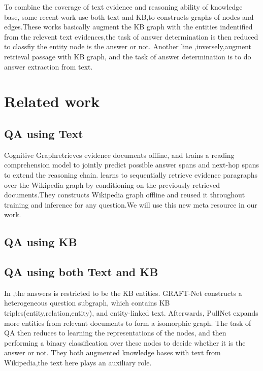 \documentclass[sigconf]{acmart}
\begin{document}
	To combine the coverage of text evidence and reasoning ability of knowledge base, some recent work  use both text and KB,to constructs graphs of nodes and edges\cite{sun2018open,sun2019pullnet,xiong2019improving}.These works basically augment the KB graph with the entities indentified from the relevent text evidences,the task of answer determination is then reduced to classfiy the entity node is the answer or not.
	Another line\cite{min2019knowledge,ding2019cognitive} ,inversely,augment retrieval passage with KB graph, and the task of answer determination is to do answer extraction from text.
	
	\section{Related work}
	\subsection{QA using Text}
	Cognitive Graph\cite{ding2019cognitive}retrieves evidence documents offline, and trains a reading comprehension model to jointly predict possible answer spans and next-hop spans to extend the reasoning chain. \cite{asai2019learning}learns to sequentially retrieve evidence paragraphs over the Wikipedia graph  by conditioning on the previously retrieved documents.They constructs Wikipedia graph offline and  reused it throughout training and inference for any question.We will use this new meta resource in our work.
	\subsection{QA using KB}
	\subsection{QA using both Text and KB}
	In \cite{sun2018open,sun2019pullnet,xiong2019improving},the  answers is restricted to be the KB entities. GRAFT-Net \cite{sun2018open} constructs a heterogeneous question subgraph, which contains  KB triples(entity,relation,entity), and entity-linked text. Afterwards, PullNet \cite{sun2019pullnet} expands more  entities from relevant documents to form a isomorphic graph. The task of QA then reduces to learning the representations of the nodes, and then performing a binary classification over these nodes to decide whether it is the answer or not. They both augmented knowledge bases with text from Wikipedia,the text here plays an auxiliary role.
	
\end{document}
